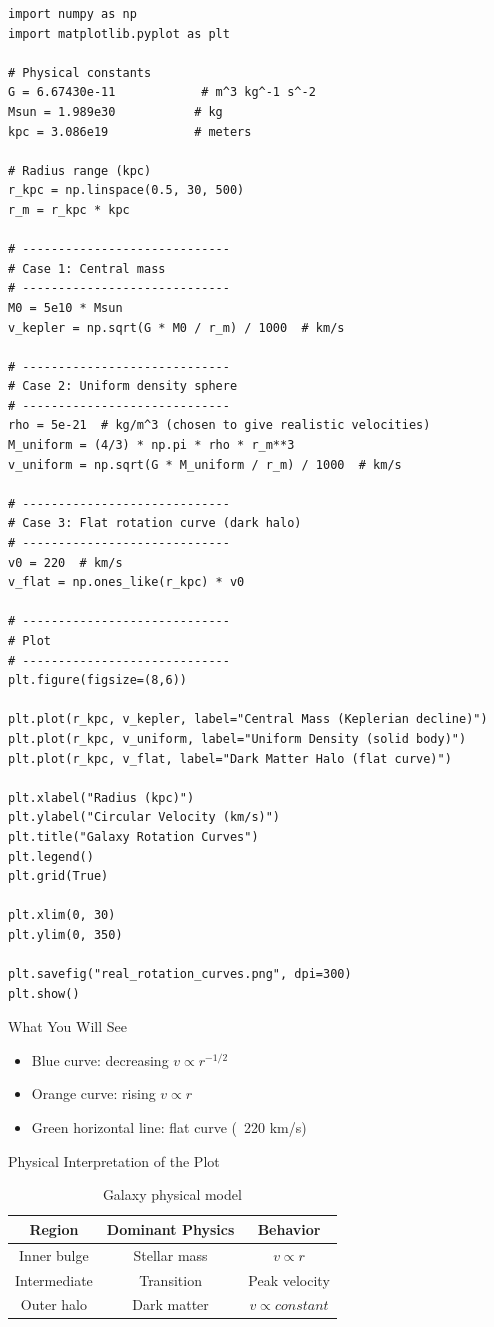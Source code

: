 \documentclass[14pt,a4paper]{article}
\begin{document}
\begin{verbatim}
import numpy as np
import matplotlib.pyplot as plt

# Physical constants
G = 6.67430e-11            # m^3 kg^-1 s^-2
Msun = 1.989e30           # kg
kpc = 3.086e19            # meters

# Radius range (kpc)
r_kpc = np.linspace(0.5, 30, 500)
r_m = r_kpc * kpc

# -----------------------------
# Case 1: Central mass
# -----------------------------
M0 = 5e10 * Msun
v_kepler = np.sqrt(G * M0 / r_m) / 1000  # km/s

# -----------------------------
# Case 2: Uniform density sphere
# -----------------------------
rho = 5e-21  # kg/m^3 (chosen to give realistic velocities)
M_uniform = (4/3) * np.pi * rho * r_m**3
v_uniform = np.sqrt(G * M_uniform / r_m) / 1000  # km/s

# -----------------------------
# Case 3: Flat rotation curve (dark halo)
# -----------------------------
v0 = 220  # km/s
v_flat = np.ones_like(r_kpc) * v0

# -----------------------------
# Plot
# -----------------------------
plt.figure(figsize=(8,6))

plt.plot(r_kpc, v_kepler, label="Central Mass (Keplerian decline)")
plt.plot(r_kpc, v_uniform, label="Uniform Density (solid body)")
plt.plot(r_kpc, v_flat, label="Dark Matter Halo (flat curve)")

plt.xlabel("Radius (kpc)")
plt.ylabel("Circular Velocity (km/s)")
plt.title("Galaxy Rotation Curves")
plt.legend()
plt.grid(True)

plt.xlim(0, 30)
plt.ylim(0, 350)

plt.savefig("real_rotation_curves.png", dpi=300)
plt.show()
\end{verbatim}
What You Will See
\begin{itemize}
\item Blue curve: decreasing \(v \propto r^{−1/2}\)
\item Orange curve: rising \(v \propto r\)
\item Green horizontal line: flat curve (~220 km/s)
\end{itemize}
Physical Interpretation of the Plot
\begin{table}[h!]
\begin{center}
\begin{tabular}{|c|c|c|}
\hline
\textbf{Region}& \textbf{Dominant Physics}& \textbf{Behavior}\\
\hline
Inner bulge& Stellar mass& $v \propto r$\\
\hline
Intermediate& Transition& Peak velocity\\
\hline
Outer halo& Dark matter& $v \propto constant$\\
\hline
\end{tabular}
\end{center}
\caption{Galaxy physical model}
\end{table}
\end{document}
